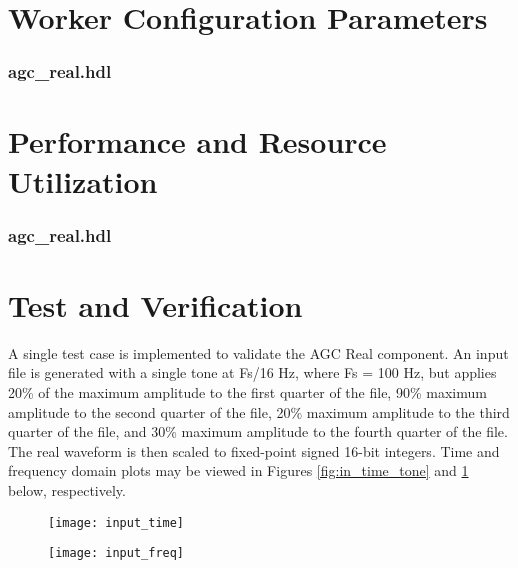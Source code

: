 \documentclass{article}
\def\comp{agc\_real}
\edef\ecomp{agc_real}
\begin{document}
\begin{landscape}
\section*{Worker Configuration Parameters}
\subsubsection*{\comp.hdl}
%
\section*{Performance and Resource Utilization}
\subsubsection*{\comp.hdl}
%
\end{landscape}
\section*{Test and Verification}

\begin{flushleft}
	A single test case is implemented to validate the AGC Real component. An input file is generated with a single tone at Fs/16 Hz, where Fs = 100 Hz, but applies 20\% of the maximum amplitude to the first quarter of the file, 90\% maximum amplitude to the second quarter of the file, 20\% maximum amplitude to the third quarter of the file, and 30\% maximum amplitude to the fourth quarter of the file. The real waveform is then scaled to fixed-point signed 16-bit integers. Time and frequency domain plots may be viewed in Figures \ref{fig:in_time_tone} and \ref{fig:in_freq_tone} below, respectively.
\end{flushleft}

	\begin{figure}[ht]
		\centering
		\begin{minipage}{.5\textwidth}
			\centering\texttt{[image: input\_time]}
			\label{fig:in_time_tone}
		\end{minipage}%
		\begin{minipage}{.5\textwidth}
			\centering\texttt{[image: input\_freq]}
			\label{fig:in_freq_tone}
		\end{minipage}
	\end{figure}
\end{document}
